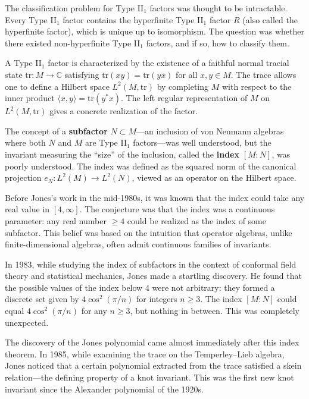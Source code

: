 The classification problem for Type II$_1$ factors was thought to be intractable. Every Type II$_1$ factor contains the hyperfinite Type II$_1$ factor $R$ (also called the hyperfinite factor), which is unique up to isomorphism. The question was whether there existed non-hyperfinite Type II$_1$ factors, and if so, how to classify them.

A Type II$_1$ factor is characterized by the existence of a faithful normal tracial state $\text{tr}: M \to \mathbb{C}$ satisfying $\text{tr}(xy) = \text{tr}(yx)$ for all $x, y \in M$. The trace allows one to define a Hilbert space $L^2(M, \text{tr})$ by completing $M$ with respect to the inner product $\langle x, y \rangle = \text{tr}(y^* x)$. The left regular representation of $M$ on $L^2(M, \text{tr})$ gives a concrete realization of the factor.

The concept of a \textbf{subfactor} $N \subset M$---an inclusion of von Neumann algebras where both $N$ and $M$ are Type II$_1$ factors---was well understood, but the invariant measuring the ``size'' of the inclusion, called the \textbf{index} $[M:N]$, was poorly understood. The index was defined as the squared norm of the canonical projection $e_N: L^2(M) \to L^2(N)$, viewed as an operator on the Hilbert space.

Before Jones's work in the mid-1980s, it was known that the index could take any real value in $[4, \infty]$. The conjecture was that the index was a continuous parameter: any real number $\geq 4$ could be realized as the index of some subfactor. This belief was based on the intuition that operator algebras, unlike finite-dimensional algebras, often admit continuous families of invariants.

In 1983, while studying the index of subfactors in the context of conformal field theory and statistical mechanics, Jones made a startling discovery. He found that the possible values of the index below 4 were not arbitrary: they formed a discrete set given by $4\cos^2(\pi/n)$ for integers $n \geq 3$. The index $[M:N]$ could equal $4\cos^2(\pi/n)$ for any $n \geq 3$, but nothing in between. This was completely unexpected.

The discovery of the Jones polynomial came almost immediately after this index theorem. In 1985, while examining the trace on the Temperley--Lieb algebra, Jones noticed that a certain polynomial extracted from the trace satisfied a skein relation---the defining property of a knot invariant. This was the first new knot invariant since the Alexander polynomial of the 1920s.

